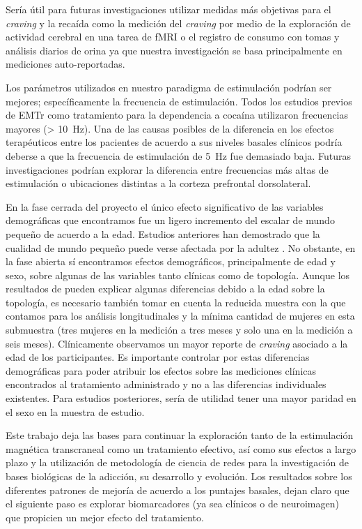 Sería útil para futuras investigaciones utilizar medidas más objetivas para el \textit{craving} y la recaída \textemdash{}como la medición del \textit{craving} por medio de la exploración de actividad cerebral en una tarea de fMRI o el registro de consumo con tomas y análisis diarios de orina\textemdash{} ya que nuestra investigación se basa principalmente en mediciones auto-reportadas. \par
Los parámetros utilizados en nuestro paradigma de estimulación podrían ser mejores; específicamente la frecuencia de estimulación. Todos los estudios previos de EMTr como tratamiento para la dependencia a cocaína utilizaron frecuencias mayores (\deactivatequoting\SI{> 10}{\hertz}\activatequoting). Una de las causas posibles de la diferencia en los efectos terapéuticos entre los pacientes de acuerdo a sus niveles basales clínicos podría deberse a que la frecuencia de estimulación de \SI{5}{\hertz} fue demasiado baja. Futuras investigaciones podrían explorar la diferencia entre frecuencias más altas de estimulación o ubicaciones distintas a la corteza prefrontal dorsolateral.\par
En la fase cerrada del proyecto el único efecto significativo de las variables demográficas que encontramos fue un ligero incremento del escalar de mundo pequeño de acuerdo a la edad. Estudios anteriores han demostrado que la cualidad de mundo pequeño puede verse afectada por la adultez \parencite{Achard2007}. No obstante, en la fase abierta sí encontramos efectos demográficos, principalmente  de edad y sexo, sobre algunas de las variables tanto clínicas como de topología. Aunque los resultados de \textcite{Achard2007} pueden explicar algunas diferencias debido a la edad sobre la topología, es necesario también tomar en cuenta la reducida muestra con la que contamos para los análisis longitudinales y la mínima cantidad de mujeres en esta submuestra (tres mujeres en la medición a tres meses y solo una en la medición a seis meses). Clínicamente observamos un mayor reporte de \textit{craving} asociado a la edad de los participantes. Es importante controlar por estas diferencias demográficas para poder atribuir los efectos sobre las mediciones clínicas encontrados al tratamiento administrado y no a las diferencias individuales existentes. Para estudios posteriores, sería de utilidad tener una mayor paridad en el sexo en la muestra de estudio.\par
Este trabajo deja las bases para continuar la exploración tanto de la estimulación magnética transcraneal como un tratamiento efectivo, así como sus efectos a largo plazo y la utilización de metodología de ciencia de redes para la investigación de bases biológicas de la adicción, su desarrollo y evolución. Los resultados sobre los diferentes patrones de mejoría de acuerdo a los puntajes basales, dejan claro que el siguiente paso es explorar biomarcadores (ya sea clínicos o de neuroimagen) que propicien un mejor efecto del tratamiento.
